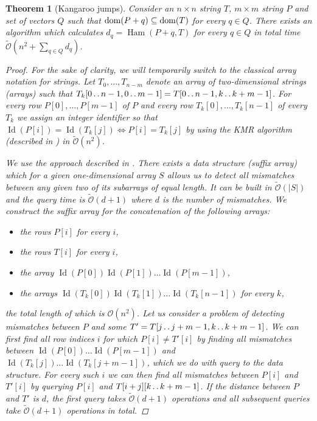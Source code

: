 \documentclass[11pt]{article}
\def\dd{\mathinner{.\,.}}
\renewcommand{\O}{\mathcal{O}}
\newcommand{\tO}{\tilde{\mathcal{O}}}
\theoremstyle{plain}
\newtheorem{theorem}{Theorem}
\theoremstyle{definition}
\theoremstyle{remark}
\DeclareMathOperator*{\Ham}{Ham}
\DeclareMathOperator*{\ID}{Id}
\begin{document}
\begin{theorem}[Kangaroo jumps]\label{kangaroos}
	Consider an $n \times n$ string $T$, $m \times m$ string $P$ and set of vectors $Q$ such that $\operatorname*{dom}(P + q) \subseteq \operatorname*{dom}(T)$ for every $q \in Q$.
	There exists an algorithm which calculates $ d_q = \Ham(P + q, T) $ for every $q \in Q$ in total time $\tO(n^2 + \sum_{q \in Q} d_q)$.
	\begin{proof}
		For the sake of clarity, we will temporarily switch to the classical array notation for strings.
		Let $T_0, \dots, T_{n - m}$ denote an array of two-dimensional strings (arrays) such that $T_k[0 \dd n - 1, 0 \dd m - 1] = T[0 \dd n - 1, k \dd k + m - 1]$.
		For every row $P[0], \dots, P[m - 1]$ of $P$ and every row $T_k[0], \dots, T_k[n - 1]$ of every $T_k$ we assign an integer identifier so that $\ID(P[i]) = \ID(T_k[j]) \Leftrightarrow P[i] = T_k[j]$ by using the KMR algorithm (described in \cite{Karp1972}) in $\tO(n^2)$.
		
		We use the approach described in \cite{Galil1986}.
		There exists a data structure (suffix array) which for a given one-dimensional array $S$ allows us to detect all mismatches between any given two of its subarrays of equal length.
		It can be built in $\tO(|S|)$ and the query time is $\tO(d + 1)$ where $d$ is the number of mismatches.
		We construct the suffix array for the concatenation of the following arrays:
		\begin{itemize}
			\item the rows $P[i]$ for every $i$,
			\item the rows $T[i]$ for every $i$,
			\item the array $\ID(P[0]) \ID(P[1]) \dots \ID(P[m - 1])$,
			\item the arrays $\ID(T_k[0]) \ID(T_k[1]) \dots \ID(T_k[n - 1])$ for every $k$,
		\end{itemize}
		the total length of which is $\O(n^2)$.
		Let us consider a problem of detecting mismatches between $P$ and some $T' = T[j \dd j + m - 1, k \dd k + m - 1]$.
		We can first find all row indices $i$ for which $P[i] \neq T'[i]$ by finding all mismatches between $\ID(P[0]) \dots \ID(P[m - 1])$ and $\ID(T_k[j]) \dots \ID(T_k[j + m - 1])$, which we do with query to the data structure.
		For every such $i$ we can then find all mismatches between $P[i]$ and $T'[i]$ by querying $P[i]$ and $T[i + j][k \dd k + m - 1]$.
		If the distance between $P$ and $T'$ is $d$, the first query takes $\tO(d + 1)$ operations and all subsequent queries take $\tO(d + 1)$ operations in total.
	\end{proof}
\end{theorem}
\end{document}
